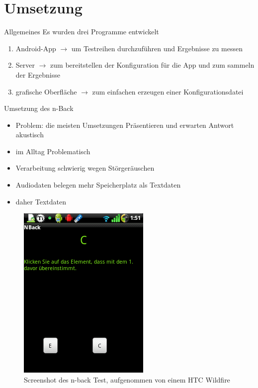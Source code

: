 ﻿\section{Umsetzung}

\begin{frame}{Allgemeines}
	Es wurden drei Programme entwickelt
	\pause
	\begin{enumerate}[<+->]
	\item Android-App $\rightarrow$ um Testreihen durchzuführen und Ergebnisse zu messen
	\item Server $\rightarrow$ zum bereitstellen der Konfiguration für die App und zum sammeln der Ergebnisse
	\item grafische Oberfläche $\rightarrow$ zum einfachen erzeugen einer Konfigurationsdatei
	\end{enumerate}
\end{frame}
\begin{frame}{Umsetzung des n-Back}
	\begin{itemize}[<+->]
	\item Problem: die meisten Umsetzungen Präsentieren und erwarten Antwort akustisch
	\item im Alltag Problematisch
	\item Verarbeitung schwierig wegen Störgeräuschen
	\item Audiodaten belegen mehr Speicherplatz als Textdaten
	\item daher Textdaten
	\end{itemize}
\end{frame}
\begin{frame}
	\begin{figure}[hbtp]
	\centering
	\includegraphics[width=0.4\linewidth]{pictures/screenshot-nback}
	\caption{Screenshot des n-back Test, aufgenommen von einem HTC Wildfire}
	\label{fig:sreen-nback}
	\end{figure}	
\end{frame}
